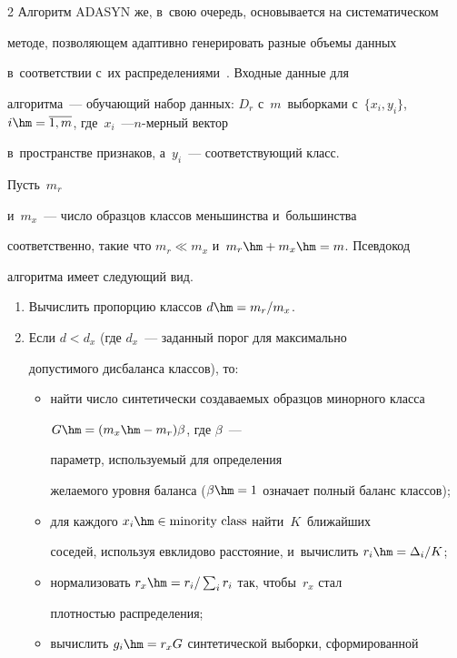 \begin{multicols}{2}
  Алгоритм ADASYN же, в~свою очередь, основывается на систематическом 

методе, позволяющем адаптивно генерировать разные объемы данных 

в~соответствии с~их распределениями~\cite{6-sev}. Входные данные для 

алгоритма~--- обучающий набор данных: $D_r$ с~$m$~выборками с~$\{x_i, 

y_i\}$, $i\hm=\overline{1,m}$, где~$x_i$~---\linebreak $n$-мер\-ный вектор 

в~пространстве признаков, а~$y_i$~--- соответствующий класс. 



Пусть~$m_r$ 

и~$m_x$~--- число образцов классов меньшинства и~большинства 

соответственно, такие что $m_r\ll m_x$ и~$m_r\hm+m_x\hm=m$. Псевдокод 

алгоритма имеет следующий вид.

  \begin{enumerate}[1.]

\item Вычислить пропорцию классов $d \hm= m_r/m_x$.

\item Если $d < d_x$ (где $d_x$~--- заданный порог для максимально 

допустимого дисбаланса классов), то:

\begin{itemize}

\item[(a)] найти число синтетически создаваемых образцов минорного класса 

$G\hm= (m_x\hm- m_r)\beta$,  где $\beta$~---

параметр, используемый для определения 

желаемого уровня баланса ($\beta\hm=1$  означает полный баланс классов); 

\item[(б)] для каждого $x_i\hm\in \mbox{minority\ class}$ найти~$K$~ближайших 

соседей, используя евклидово расстояние, и~вычислить $r_i\hm= \Delta_i/K$;

\item[(в)] нормализовать $r_x\hm= r_i/\sum\nolimits_i r_i$ так, чтобы~$r_x$ стал 

плотностью распределения;

\item[(г)] вычислить $g_i\hm= r_x  G$ синтетической выборки, сформированной 


\end{itemize}
\end{enumerate}
\end{multicols}
